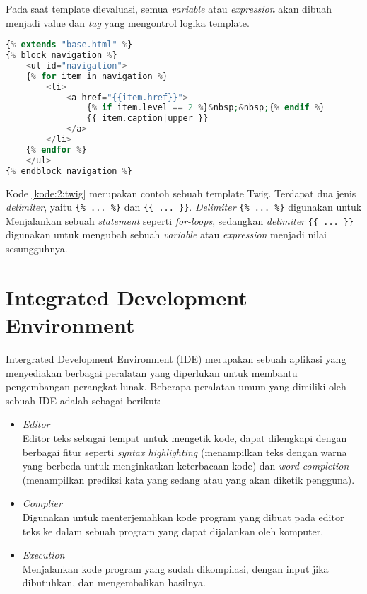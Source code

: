 Pada saat template dievaluasi, semua \textit{variable} atau \textit{expression} akan dibuah menjadi value dan \textit{tag} yang mengontrol logika template.

\begin{lstlisting}[language={php}, caption={Contoh template Twig}, label={kode:2:twig}]
{% extends "base.html" %}
{% block navigation %}
	<ul id="navigation">
	{% for item in navigation %}
		<li>
			<a href="{{item.href}}">
				{% if item.level == 2 %}&nbsp;&nbsp;{% endif %}
				{{ item.caption|upper }}
			</a>
		</li>
	{% endfor %}
	</ul>
{% endblock navigation %}
\end{lstlisting}

Kode \ref{kode:2:twig} merupakan contoh sebuah template Twig. Terdapat dua jenis \textit{delimiter}, yaitu \verb|{% ... %}| dan \verb|{{ ... }}|. \textit{Delimiter} \verb|{% ... %}| digunakan untuk Menjalankan sebuah \textit{statement} seperti \textit{for-loops}, sedangkan \textit{delimiter} \verb|{{ ... }}| digunakan untuk mengubah sebuah \textit{variable} atau \textit{expression} menjadi nilai sesungguhnya.

\section{Integrated Development Environment}
\label{sec:2:ide}

Intergrated Development Environment (IDE) merupakan sebuah aplikasi yang menyediakan berbagai peralatan yang diperlukan untuk membantu pengembangan perangkat lunak. Beberapa peralatan umum yang dimiliki oleh sebuah IDE adalah sebagai berikut:

\begin{itemize}
	\item \textit{Editor} \\
	      Editor teks sebagai tempat untuk mengetik kode, dapat dilengkapi dengan berbagai fitur seperti \textit{syntax highlighting} (menampilkan teks dengan warna yang berbeda untuk menginkatkan keterbacaan kode) dan \textit{word completion} (menampilkan prediksi kata yang sedang atau yang akan diketik pengguna).
	\item \textit{Complier} \\
	      Digunakan untuk menterjemahkan kode program yang dibuat pada editor teks ke dalam sebuah program yang dapat dijalankan oleh komputer.
	\item \textit{Execution} \\
	      Menjalankan kode program yang sudah dikompilasi, dengan input jika dibutuhkan, dan mengembalikan hasilnya.
\end{itemize}

